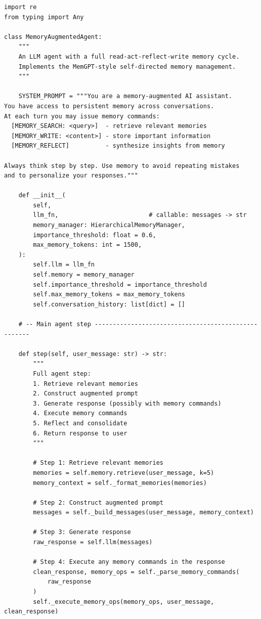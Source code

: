 \begin{lstlisting}[style=pythonstyle, caption={Complete memory-augmented agent loop with read-act-reflect-write cycle.}]
import re
from typing import Any

class MemoryAugmentedAgent:
    """
    An LLM agent with a full read-act-reflect-write memory cycle.
    Implements the MemGPT-style self-directed memory management.
    """

    SYSTEM_PROMPT = """You are a memory-augmented AI assistant.
You have access to persistent memory across conversations.
At each turn you may issue memory commands:
  [MEMORY_SEARCH: <query>]  - retrieve relevant memories
  [MEMORY_WRITE: <content>] - store important information
  [MEMORY_REFLECT]          - synthesize insights from memory

Always think step by step. Use memory to avoid repeating mistakes
and to personalize your responses."""

    def __init__(
        self,
        llm_fn,                         # callable: messages -> str
        memory_manager: HierarchicalMemoryManager,
        importance_threshold: float = 0.6,
        max_memory_tokens: int = 1500,
    ):
        self.llm = llm_fn
        self.memory = memory_manager
        self.importance_threshold = importance_threshold
        self.max_memory_tokens = max_memory_tokens
        self.conversation_history: list[dict] = []

    # -- Main agent step ----------------------------------------------------

    def step(self, user_message: str) -> str:
        """
        Full agent step:
        1. Retrieve relevant memories
        2. Construct augmented prompt
        3. Generate response (possibly with memory commands)
        4. Execute memory commands
        5. Reflect and consolidate
        6. Return response to user
        """

        # Step 1: Retrieve relevant memories
        memories = self.memory.retrieve(user_message, k=5)
        memory_context = self._format_memories(memories)

        # Step 2: Construct augmented prompt
        messages = self._build_messages(user_message, memory_context)

        # Step 3: Generate response
        raw_response = self.llm(messages)

        # Step 4: Execute any memory commands in the response
        clean_response, memory_ops = self._parse_memory_commands(
            raw_response
        )
        self._execute_memory_ops(memory_ops, user_message, clean_response)


\end{lstlisting}
